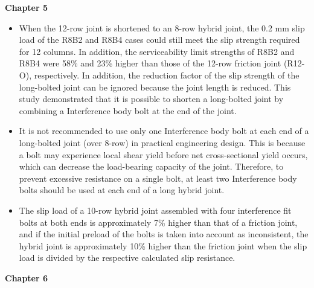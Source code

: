 \textbf{Chapter 5}

\begin{itemize}

\item When the 12-row joint is shortened to an 8-row hybrid joint, the 0.2 mm slip load of the R8B2 and R8B4 cases could still meet the slip strength required for 12 columns. In addition, the serviceability limit strengths of R8B2 and R8B4 were 58\% and 23\% higher than those of the 12-row friction joint (R12-O), respectively. In addition, the reduction factor of the slip strength of the long-bolted joint can be ignored because the joint length is reduced. This study demonstrated that it is possible to shorten a long-bolted joint by combining a Interference body bolt at the end of the joint. 

\item It is not recommended to use only one Interference body bolt at each end of a long-bolted joint (over 8-row) in practical engineering design. This is because a bolt may experience local shear yield before net cross-sectional yield occurs, which can decrease the load-bearing capacity of the joint. Therefore, to prevent excessive resistance on a single bolt, at least two Interference body bolts should be used at each end of a long hybrid joint.

\item The slip load of a 10-row hybrid joint assembled with four interference fit bolts at both ends is approximately 7\% higher than that of a friction joint, and if the initial preload of the bolts is taken into account as inconsistent, the hybrid joint is approximately 10\% higher than the friction joint when the slip load is divided by the respective calculated slip resistance.

\end{itemize}

\textbf{Chapter 6}

